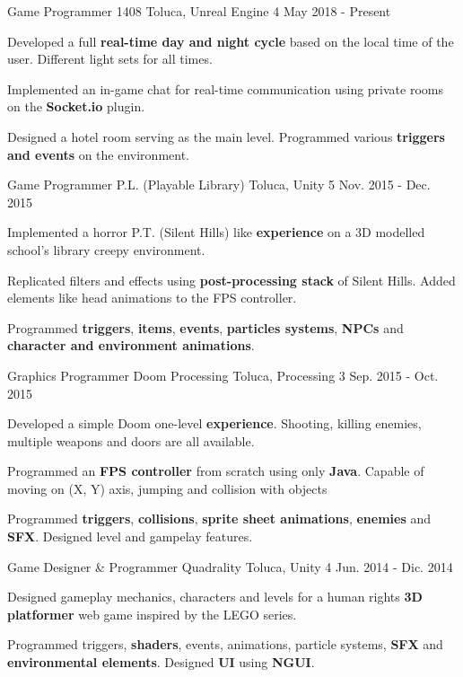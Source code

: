 \begin{cventries}
  \cventry
    {Game Programmer}
    {1408}
    {Toluca, Unreal Engine 4}
    {May 2018 - Present}
    {
      \begin{cvitems}
        \item {Developed a full \textbf{real-time day and night cycle} based on the local time of the user. Different light sets for all times. }
        \item {Implemented an in-game chat for real-time communication using private rooms on the \textbf{Socket.io} plugin. }
        \item {Designed a hotel room serving as the main level. Programmed various \textbf{triggers and events} on the environment.}
      \end{cvitems} 
    }
  \cventry
    {Game Programmer}
    {P.L. (Playable Library)}
    {Toluca, Unity 5}
    {Nov. 2015 - Dec. 2015}
    {
      \begin{cvitems}
        \item {Implemented a horror P.T. (Silent Hills) like \textbf{experience} on a 3D modelled school's library creepy environment. }
        \item {Replicated filters and effects using \textbf{post-processing stack} of Silent Hills. Added elements like head animations to the FPS controller. }
        \item {Programmed \textbf{triggers}, \textbf{items}, \textbf{events}, \textbf{particles systems}, \textbf{NPCs} and \textbf{character and environment animations}. }
      \end{cvitems}
    }
    \cventry
    {Graphics Programmer}
    {Doom Processing}
    {Toluca, Processing 3}
    {Sep. 2015 - Oct. 2015}
    {
      \begin{cvitems}
        \item {Developed a simple Doom one-level \textbf{experience}. Shooting, killing enemies, multiple weapons and doors are all available. }
        \item {Programmed an \textbf{FPS controller} from scratch using only \textbf{Java}. Capable of moving on (X, Y) axis, jumping and collision with objects}
        \item {Programmed \textbf{triggers}, \textbf{collisions}, \textbf{sprite sheet animations}, \textbf{enemies} and \textbf{SFX}. Designed level and gampelay features. }
      \end{cvitems}
    }
    \cventry
    {Game Designer \& Programmer}
    {Quadrality}
    {Toluca, Unity 4}
    {Jun. 2014 - Dic. 2014}
    {
      \begin{cvitems}
        \item {Designed gameplay mechanics, characters and levels for a human rights \textbf{3D platformer} web game inspired by the LEGO series. }
        \item {Programmed triggers, \textbf{shaders}, events, animations, particle systems, \textbf{SFX} and \textbf{environmental elements}. Designed \textbf{UI} using \textbf{NGUI}. }
      \end{cvitems}
    }
\end{cventries}
